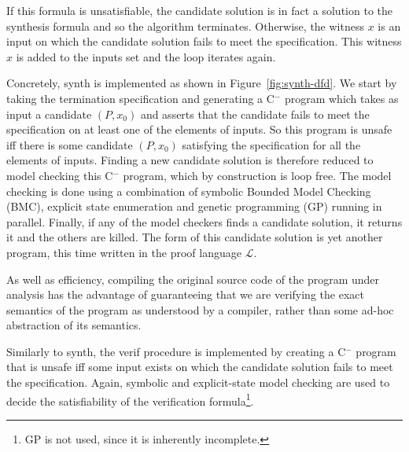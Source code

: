 \documentclass[preprint]{sigplanconf}
\theoremstyle{definition}
\newcommand{\newC}{C$^-$\xspace}
\begin{document}
If this formula is unsatisfiable, the candidate solution is in fact a
solution to the synthesis formula and so the algorithm terminates. 
Otherwise, the witness $x$ is an input on which the candidate solution fails
to meet the specification.  This witness $x$ is added to the {\sc inputs}
set and the loop iterates again.

Concretely, {\sc synth} is implemented as shown in
Figure~\ref{fig:synth-dfd}.  We start by taking the termination
specification and generating a \newC program which takes as input a candidate
$(P, x_0)$ and asserts that the candidate fails to meet the specification on
at least one of the elements of {\sc inputs}.  So this program is unsafe iff
there is some candidate $(P, x_0)$ satisfying the specification for all the
elements of {\sc inputs}.  Finding a new candidate solution is therefore
reduced to model checking this \newC program, which by construction is loop
free.  The model checking is done using a combination of symbolic Bounded Model
Checking (BMC), explicit state enumeration and genetic programming (GP) running in
parallel.
Finally, if any of the model checkers finds a candidate solution, it returns it
and the others are killed.  The form of
this candidate solution is yet another program, this time written in the
proof language $\mathcal{L}$.

As well as efficiency, compiling the original source code of the program
under analysis has the advantage of guaranteeing that we are verifying the
exact semantics of the program as understood by a compiler, rather than some
ad-hoc abstraction of its semantics.

Similarly to {\sc synth}, the {\sc verif} procedure is implemented by
creating a \newC program that is unsafe iff some input exists on which the
candidate solution fails to meet the specification.  Again, symbolic and
explicit-state model checking are used to decide the satisfiability of the
verification formula\footnote{GP is not used, since it is inherently incomplete.}.
\end{document}
